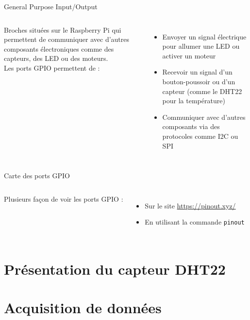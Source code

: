 \documentclass[aspectratio=169,xcolor=dvipsnames]{beamer}
\begin{document}
\begin{frame}{General Purpose Input/Output}
    \begin{columns}[c] %

        Broches situées sur le Raspberry Pi qui permettent de communiquer avec d'autres composants électroniques comme des capteurs, des LED ou des moteurs.\\
        \vspace{5mm}
        Les ports GPIO permettent de :
        \begin{itemize}
            \item Envoyer un signal électrique pour allumer une LED ou activer un moteur
            \item Recevoir un signal d'un bouton-poussoir ou d'un capteur (comme le DHT22 pour la température)
            \item Communiquer avec d'autres composants via des protocoles comme I2C ou SPI
        \end{itemize}
    \end{columns}
\end{frame}

\begin{frame}{Carte des ports GPIO}
    \begin{columns}[c] %

        Plusieurs façon de voir les ports GPIO :
        \vspace{5mm}
        \begin{itemize}
            \item Sur le site \url{https://pinout.xyz/}
            \item En utilisant la commande \texttt{pinout}
        \end{itemize}
    \end{columns}
\end{frame}


\section{Présentation du capteur DHT22}
\section{Acquisition de données}
\end{document}
